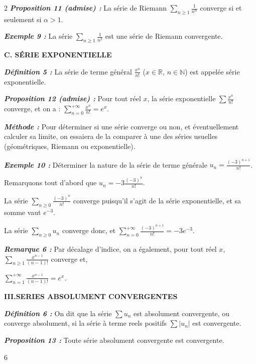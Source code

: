 \documentclass[10pt,a4paper]{article}
\begin{document}
\begin{multicols}{2}
\textbf{\textit{Proposition 11 (admise) :}} La série de Riemann $\sum_{n \ge 1} \frac{1}{n^\alpha}$ converge si et seulement si $\alpha > 1$.

\textbf{\textit{Exemple 9 :}} La série $\sum_{n \ge 1} \frac{1}{n^2}$ est une série de Riemann convergente.

\vspace{0.1cm}
\textbf{\textcolor{maingreen}{C. SÉRIE EXPONENTIELLE}}

\textbf{\textit{Définition 5 :}} La série de terme général $\frac{x^n}{n!}$ ($x \in \mathbb{R}$, $n \in \mathbb{N}$) est appelée série exponentielle.

\textbf{\textit{Proposition 12 (admise) :}} Pour tout réel $x$, la série exponentielle $\sum \frac{x^n}{n!}$ converge, et on a : $\sum_{n=0}^{+\infty} \frac{x^n}{n!} = e^x$.

\textbf{\textit{Méthode :}} Pour déterminer si une série converge ou non, et éventuellement calculer sa limite, on essaiera de la comparer à une des séries usuelles (géométriques, Riemann ou exponentielle).

\textbf{\textit{Exemple 10 :}} Déterminer la nature de la série de terme générale $u_n = \frac{(-3)^{n+1}}{n!}$.

Remarquons tout d'abord que $u_n = -3 \frac{(-3)^n}{n!}$.

La série $\sum_{n \ge 0} \frac{(-3)^n}{n!}$ converge puisqu'il s'agit de la série exponentielle, et sa somme vaut $e^{-3}$.

La série $\sum_{n \ge 0} u_n$ converge donc, et $\sum_{n=0}^{+\infty} \frac{(-3)^{n+1}}{n!} = -3 e^{-3}$.

\textbf{\textit{Remarque 6 :}} Par décalage d'indice, on a également, pour tout réel $x$, $\sum_{n \ge 1} \frac{x^{n-1}}{(n-1)!}$ converge et,

$\sum_{n=1}^{+\infty} \frac{x^{n-1}}{(n-1)!} = e^x$.

\vspace{0.2cm}
\textbf{\textcolor{mainbrown}{III.\quad SERIES ABSOLUMENT CONVERGENTES}}

\vspace{0.1cm}
\textbf{\textit{Définition 6 :}} On dit que la série $\sum u_n$ est absolument convergente, ou converge absolument, si la série à terme reels positifs $\sum |u_n|$ est convergente.

\textbf{\textit{Proposition 13 :}} Toute série absolument convergente est convergente.

\vfill
\centerline{\footnotesize 6}

\end{multicols}
\end{document}
